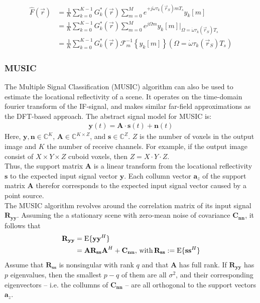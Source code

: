 \begin{align}
    \hat F(\vec r) & = \frac{1}{K}\sum_{k=0}^{K-1}G_k^\ast(\vec r)
    \sum_{m=0}^{M} e^{+j\dot\omega\tau_k(\vec r_S)mT_s} y_k[m]     \\
                   & = \frac{1}{K}\sum_{k=0}^{K-1}G_k^\ast(\vec r)
    \sum_{m=0}^{M} e^{j\Omega m} y_k[m]
    \Big|_{\Omega=\dot\omega\tau_k(\vec r_S)T_s}                   \\
                   & = \frac{1}{K}\sum_{k=0}^{K-1}G_k^\ast(\vec r)
    \mathcal{F}_m^{-1} \left\{ y_k[m]\right\}(\Omega=\dot\omega\tau_k(\vec r_S)T_s)
\end{align}

\subsubsection*{MUSIC}
The Multiple Signal Classification (MUSIC) algorithm can also be used to estimate the locational reflectivity of a scene.
It operates on the time-domain fourier transform of the IF-signal, and makes similar far-field approximations as the DFT-based approach.
The abstract signal model for MUSIC is:
\begin{align}
    \mathbf y(t) = \mathbf A \cdot \mathbf s(t) + \mathbf n(t)
\end{align}
Here, $\mathbf y,\mathbf n \in \mathbb{C}^{K}$,
$\mathbf A \in \mathbb{C}^{K \times Z}$, and
$\mathbf s \in \mathbb{C}^{Z}$.
$Z$ is the number of voxels in the output image and $K$ the number of receive channels.
For example, if the output image consist of $X \times Y \times Z$ cuboid voxels, then $Z=X\cdot Y\cdot Z$. \\
Thus, the support matrix $\mathbf A$ is a linear transform from the locational reflectivity $\mathbf{s}$
to the expected input signal vector $\mathbf{y}$.
Each collumn vector $\mathbf a_z$ of the support matrix $\mathbf A$ therefor corresponds to the expected input signal vector caused by a point source. \\

The MUSIC algorithm revolves around the correlation matrix of its input signal $\mathbf{R_{yy}}$.
Assuming the a stationary scene with zero-mean noise of covariance $\mathbf{C_{nn}}$,
it follows that
\begin{align}
    \mathbf{R_{yy}} & = \text{E}\{\mathbf{yy}^H\}             \\
                    & =\mathbf{AR_{ss}A}^H + \mathbf{C_{nn}},
    \text{\,with\,} \mathbf{R_{ss}} := \text{E}\{\mathbf{ss}^H\}
\end{align}
Assume that $\mathbf{R_{ss}}$ is nonsingular with rank $q$ and that $\mathbf{A}$ has full rank.
If $\mathbf{R_{yy}}$ has $p$ eigenvalues, then the smallest $p-q$ of them are all $\sigma^2$,
and their corresponding eigenvectors -- i.e. the collumns of $\mathbf{C_{nn}}$ -- are all orthogonal to the support vectors $\mathbf a_z$.

